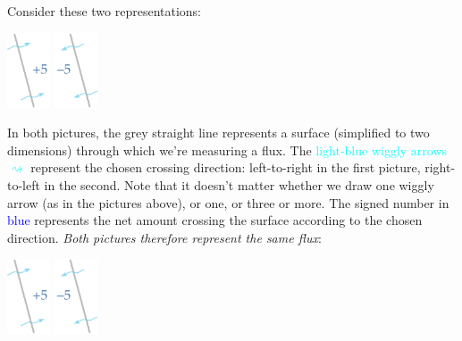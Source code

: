 Consider these two representations:\noprelistbreak
\begin{center}\label{fig:scalar_fluxes}
  \bigskip
\hspace*{\fill}\includegraphics[height=6em]{images/flux_plus5c.pdf}
\hfill\includegraphics[height=6em]{images/flux_minus5c.pdf}
\hspace*{\fill}
\end{center}
In both pictures, the \textcolor{midgrey}{grey straight line} represents a surface (simplified to two dimensions) through which we're measuring a flux. The \textcolor{cyan}{light-blue wiggly arrows $\rightsquigarrow$} represent the chosen crossing direction: left-to-right in the first picture, right-to-left in the second. Note that it doesn't matter whether we draw one wiggly arrow (as in the pictures above), or one, or three or more. The signed number in \textcolor{blue}{blue} represents the net amount crossing the surface according to the chosen direction. \emph{Both pictures therefore represent the same flux}:\noprelistbreak
\begin{center}\label{fig:scalar_fluxes}
  \bigskip
\hspace*{\fill}\includegraphics[align=c,height=6em]{images/flux_plus5c.pdf}
\qquad
\includegraphics[align=c,height=6em]{images/flux_minus5c.pdf}
\hspace*{\fill}
\end{center}

